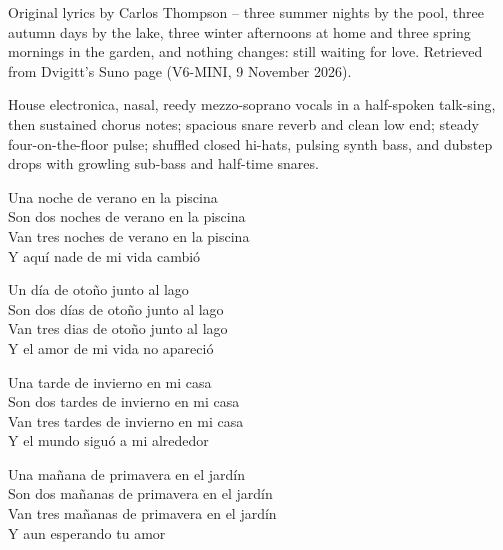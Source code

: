 
\label{sec:tres-noches-de-verano}
\begin{notes}
Original lyrics by Carlos Thompson -- three summer nights by the pool, three autumn days by the lake, three winter afternoons at home and three spring mornings in the garden, and nothing changes: still waiting for love. Retrieved from Dvigitt's Suno page (V6-MINI, 9 November 2026).
\end{notes}
\begin{style}
House electronica, nasal, reedy mezzo-soprano vocals in a half-spoken talk-sing, then sustained chorus notes; spacious snare reverb and clean low end; steady four-on-the-floor pulse; shuffled closed hi-hats, pulsing synth bass, and dubstep drops with growling sub-bass and half-time snares.
\end{style}
\begin{lyrics}
Una noche de verano en la piscina\\
Son dos noches de verano en la piscina\\
Van tres noches de verano en la piscina\\
Y aquí nade de mi vida cambió

Un día de otoño junto al lago\\
Son dos días de otoño junto al lago\\
Van tres dias de otoño junto al lago\\
Y el amor de mi vida no apareció

Una tarde de invierno en mi casa\\
Son dos tardes de invierno en mi casa\\
Van tres tardes de invierno en mi casa\\
Y el mundo siguó a mi alrededor

Una mañana de primavera en el jardín\\
Son dos mañanas de primavera en el jardín\\
Van tres mañanas de primavera en el jardín\\
Y aun esperando tu amor
\end{lyrics}

